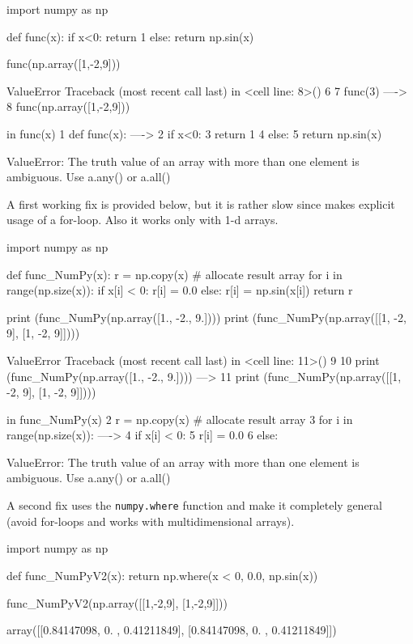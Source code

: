 \begin{ipythonnon}
import numpy as np

def func(x):
  if x<0: 
    return 1
  else: 
    return np.sin(x)

func(np.array([1,-2,9]))
\end{ipythonnon}
\begin{ioutput}
ValueError                      
Traceback (most recent call last) 
in <cell line: 8>()
      6 
      7 func(3)
----> 8 func(np.array([1,-2,9]))

in func(x)
      1 def func(x):
----> 2   if x<0:
      3     return 1
      4   else:
      5     return np.sin(x)

ValueError: The truth value of an array with more than one element is
ambiguous. Use a.any() or a.all()
\end{ioutput}

A first working fix is provided below, but it is rather slow since makes explicit usage of a for-loop. Also it works only with 1-d arrays.

\begin{ipythonnon}
import numpy as np

def func_NumPy(x):
  r = np.copy(x) # allocate result array
  for i in range(np.size(x)):
    if x[i] < 0:
      r[i] = 0.0
    else:
      r[i] = np.sin(x[i])
  return r

print (func_NumPy(np.array([1., -2., 9.])))
print (func_NumPy(np.array([[1, -2, 9], [1, -2, 9]])))
\end{ipythonnon}
\begin{ioutput}
[0.84147098 0.         0.41211849]

ValueError                          
Traceback (most recent call last)
 in <cell line: 11>()
      9 
     10 print (func_NumPy(np.array([1., -2., 9.])))
---> 11 print (func_NumPy(np.array([[1, -2, 9], [1, -2, 9]])))

in func_NumPy(x)
      2   r = np.copy(x) # allocate result array
      3   for i in range(np.size(x)):
----> 4     if x[i] < 0:
      5       r[i] = 0.0
      6     else:

ValueError: The truth value of an array with more than one element is
ambiguous. Use a.any() or a.all()
\end{ioutput}

A second fix uses the \texttt{numpy.where} function and make it completely general (avoid for-loops and works with multidimensional arrays).

\begin{ipythonnon}
import numpy as np

def func_NumPyV2(x):
  return np.where(x < 0, 0.0, np.sin(x))

func_NumPyV2(np.array([[1,-2,9], [1,-2,9]]))
\end{ipythonnon}
\begin{ioutput}
array([[0.84147098, 0.        , 0.41211849],
       [0.84147098, 0.        , 0.41211849]])
\end{ioutput}

